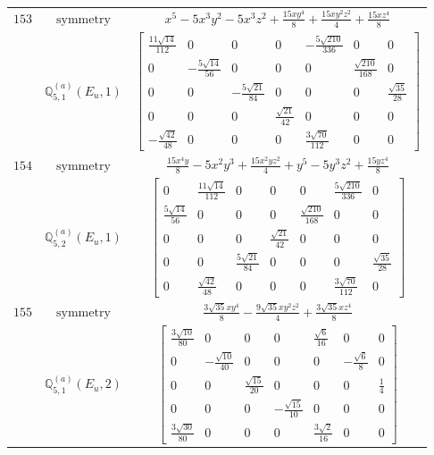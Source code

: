\documentclass[fleqn,8pt,landscape]{jsarticle}
\begin{document}
\begin{longtable}{ccc}
$ 153 $ & $ \text{symmetry} $ & $ x^{5} - 5 x^{3} y^{2} - 5 x^{3} z^{2} + \frac{15 x y^{4}}{8} + \frac{15 x y^{2} z^{2}}{4} + \frac{15 x z^{4}}{8} $ \\
$  $ & $ \mathbb{Q}_{5,1}^{(a)}(E_{u},1) $ & $ \begin{bmatrix} \frac{11 \sqrt{14}}{112} & 0 & 0 & 0 & - \frac{5 \sqrt{210}}{336} & 0 & 0 \\ 0 & - \frac{5 \sqrt{14}}{56} & 0 & 0 & 0 & \frac{\sqrt{210}}{168} & 0 \\ 0 & 0 & - \frac{5 \sqrt{21}}{84} & 0 & 0 & 0 & \frac{\sqrt{35}}{28} \\ 0 & 0 & 0 & \frac{\sqrt{21}}{42} & 0 & 0 & 0 \\ - \frac{\sqrt{42}}{48} & 0 & 0 & 0 & \frac{3 \sqrt{70}}{112} & 0 & 0 \end{bmatrix} $ \\ \hline
$ 154 $ & $ \text{symmetry} $ & $ \frac{15 x^{4} y}{8} - 5 x^{2} y^{3} + \frac{15 x^{2} y z^{2}}{4} + y^{5} - 5 y^{3} z^{2} + \frac{15 y z^{4}}{8} $ \\
$  $ & $ \mathbb{Q}_{5,2}^{(a)}(E_{u},1) $ & $ \begin{bmatrix} 0 & \frac{11 \sqrt{14}}{112} & 0 & 0 & 0 & \frac{5 \sqrt{210}}{336} & 0 \\ \frac{5 \sqrt{14}}{56} & 0 & 0 & 0 & \frac{\sqrt{210}}{168} & 0 & 0 \\ 0 & 0 & 0 & \frac{\sqrt{21}}{42} & 0 & 0 & 0 \\ 0 & 0 & \frac{5 \sqrt{21}}{84} & 0 & 0 & 0 & \frac{\sqrt{35}}{28} \\ 0 & \frac{\sqrt{42}}{48} & 0 & 0 & 0 & \frac{3 \sqrt{70}}{112} & 0 \end{bmatrix} $ \\ \hline
$ 155 $ & $ \text{symmetry} $ & $ \frac{3 \sqrt{35} x y^{4}}{8} - \frac{9 \sqrt{35} x y^{2} z^{2}}{4} + \frac{3 \sqrt{35} x z^{4}}{8} $ \\
$  $ & $ \mathbb{Q}_{5,1}^{(a)}(E_{u},2) $ & $ \begin{bmatrix} \frac{3 \sqrt{10}}{80} & 0 & 0 & 0 & \frac{\sqrt{6}}{16} & 0 & 0 \\ 0 & - \frac{\sqrt{10}}{40} & 0 & 0 & 0 & - \frac{\sqrt{6}}{8} & 0 \\ 0 & 0 & \frac{\sqrt{15}}{20} & 0 & 0 & 0 & \frac{1}{4} \\ 0 & 0 & 0 & - \frac{\sqrt{15}}{10} & 0 & 0 & 0 \\ \frac{3 \sqrt{30}}{80} & 0 & 0 & 0 & \frac{3 \sqrt{2}}{16} & 0 & 0 \end{bmatrix} $ \\ \hline

\end{longtable}
\end{document}
